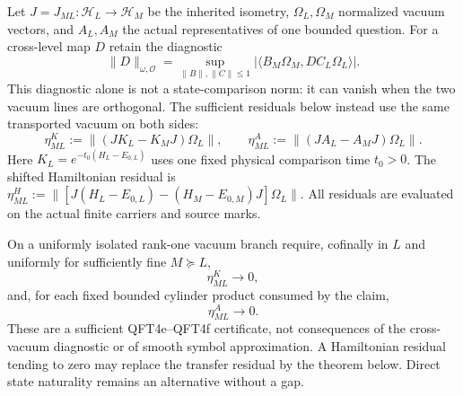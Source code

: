 \documentclass[12pt,a4paper]{article}
\begin{document}
\begin{definition}
\label{p12:def:local-vacuum-comparison-seminorm}
Let $J=J_{ML}:\mathcal H_L\to\mathcal H_M$ be the inherited isometry,
$\Omega_L,\Omega_M$ normalized vacuum vectors, and $A_L,A_M$ the actual
representatives of one bounded question. For a cross-level map $D$ retain
the diagnostic
\begin{equation}
\label{p12:eq:local-vacuum-seminorm}
 \|D\|_{\omega,\mathcal O}
 =\sup_{\|B\|,\|C\|\le1}
 |\langle B_M\Omega_M,D C_L\Omega_L\rangle|.
\end{equation}
This diagnostic alone is not a state-comparison norm: it can vanish when
the two vacuum lines are orthogonal. The sufficient residuals below instead
use the same transported vacuum on both sides:
\begin{equation}
\label{p12:eq:qft4-defects}
 \eta^K_{ML}:=\|(JK_L-K_MJ)\Omega_L\|,\qquad
 \eta^A_{ML}:=\|(JA_L-A_MJ)\Omega_L\|.
\end{equation}
Here $K_L=e^{-t_0(H_L-E_{0,L})}$ uses one fixed physical comparison time
$t_0>0$. The shifted Hamiltonian residual is
$\eta^H_{ML}:=\|[J(H_L-E_{0,L})-(H_M-E_{0,M})J]\Omega_L\|$.
All residuals are evaluated on the actual finite carriers and source marks.
\end{definition}

\begin{definition}
\label{p12:def:admissible-local-vacuum-compatibility}
On a uniformly isolated rank-one vacuum branch require, cofinally in $L$
and uniformly for sufficiently fine $M\succeq L$,
\begin{equation}
\label{p12:eq:qft4e-transfer-lv}
 \eta^K_{ML}\longrightarrow0,
\end{equation}
and, for each fixed bounded cylinder product consumed by the claim,
\begin{equation}
\label{p12:eq:qft4f-observable-lv}
 \eta^A_{ML}\longrightarrow0.
\end{equation}
These are a sufficient QFT4e--QFT4f certificate, not consequences of the
cross-vacuum diagnostic or of smooth symbol approximation. A Hamiltonian
residual tending to zero may replace the transfer residual by the theorem
below. Direct state naturality remains an alternative without a gap.
\end{definition}
\end{document}
